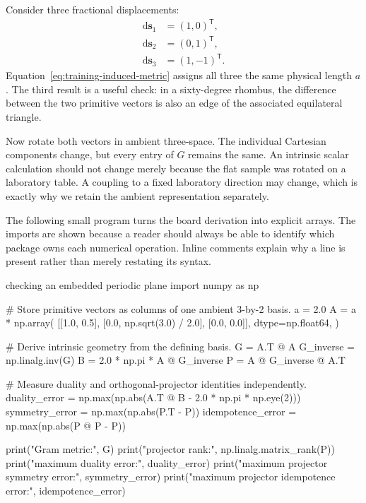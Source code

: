 Consider three fractional displacements:
\begin{equation}
  \begin{aligned}
  \mathrm{d}\mathbf s_1&=(1,0)^{\mathsf T},\\
  \mathrm{d}\mathbf s_2&=(0,1)^{\mathsf T},\\
  \mathrm{d}\mathbf s_3&=(1,-1)^{\mathsf T}.
  \end{aligned}
\end{equation}
Equation~\eqref{eq:training-induced-metric} assigns all three the same physical
length $a$. The third result is a useful check: in a sixty-degree rhombus, the
difference between the two primitive vectors is also an edge of the associated
equilateral triangle.

Now rotate both vectors in ambient three-space. The individual Cartesian
components change, but every entry of $G$ remains the same. An intrinsic scalar
calculation should not change merely because the flat sample was rotated on a
laboratory table. A coupling to a fixed laboratory direction may change, which
is exactly why we retain the ambient representation separately.

The following small program turns the board derivation into explicit arrays.
The imports are shown because a reader should always be able to identify which
package owns each numerical operation. Inline comments explain why a line is
present rather than merely restating its syntax.

\begin{pythonexample}{checking an embedded periodic plane}
import numpy as np

# Store primitive vectors as columns of one ambient 3-by-2 basis.
a = 2.0
A = a * np.array(
    [[1.0, 0.5], [0.0, np.sqrt(3.0) / 2.0], [0.0, 0.0]],
    dtype=np.float64,
)

# Derive intrinsic geometry from the defining basis.
G = A.T @ A
G_inverse = np.linalg.inv(G)
B = 2.0 * np.pi * A @ G_inverse
P = A @ G_inverse @ A.T

# Measure duality and orthogonal-projector identities independently.
duality_error = np.max(np.abs(A.T @ B - 2.0 * np.pi * np.eye(2)))
symmetry_error = np.max(np.abs(P.T - P))
idempotence_error = np.max(np.abs(P @ P - P))

print("Gram metric:\n", G)
print("projector rank:", np.linalg.matrix_rank(P))
print("maximum duality error:", duality_error)
print("maximum projector symmetry error:", symmetry_error)
print("maximum projector idempotence error:", idempotence_error)
\end{pythonexample}

